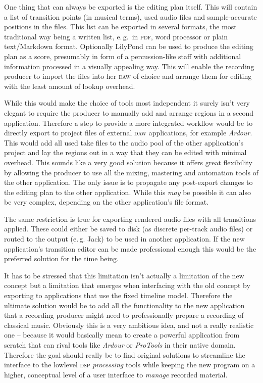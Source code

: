 \documentclass[11pt,a4paper]{article}
\begin{document}
One thing that can always be exported is the editing plan itself. This will contain
a list of transition points (in musical terms), used audio files and sample-accurate
positions in the files.
This list can be exported in several formats, the most traditional way being a written
list, e.\,g.\ in \textsc{pdf}, word processor or plain text/Markdown format.
Optionally LilyPond can be used to produce the editing plan as a score,
presumably in form of a percussion-like staff with additional information
processed in a visually appealing way.
This will enable the recording producer to import the files into her \textsc{daw} of
choice and arrange them for editing with the least amount of lookup overhead.

While this would make the choice of tools most independent it surely isn't very
elegant to require the producer to manually add and arrange regions in a second
application. Therefore a step to provide a more integrated workflow would be to
directly export to project files of external \textsc{daw} applications, for example
\emph{Ardour}. This would add all used take files to the audio pool of the other
application's project and lay the regions out in a way that they can be edited
with minimal overhead. This sounds like a very good solution because it offers
great flexibility by allowing the producer to use all the mixing, mastering and
automation tools of the other application. The only issue is to propagate any
post-export changes to the editing plan to the other application. While this
\emph{may} be possible it can also be very complex, depending on the other
application's file format.

The same restriction is true for exporting rendered audio files with all transitions
applied. These could either be saved to disk (as discrete per-track audio files) or
routed to the output (e.\,g. Jack) to be used in another application. If the new
application's transition editor can be made professional enough this would be
the preferred solution for the time being.

It has to be stressed that this limitation isn't actually a limitation of the new
concept but a limitation that emerges when interfacing with the old concept by
exporting to applications that use the fixed timeline model. Therefore the
ultimate solution would be to add all the functionality to the new application
that a recording producer might need to professionally prepare a recording of
classical music. Obviously this is a very ambitious idea, and not a really realistic
one -- because it would basically mean to create a powerful application from scratch
that can rival tools like \emph{Ardour} or \emph{ProTools} in their native domain.
Therefore the goal should really be to find original solutions to streamline the
interface to the lowlevel \textsc{dsp} \emph{processing} tools while keeping the new program on a
higher, conceptual level of a user interface to \emph{manage} recorded material.
\end{document}
